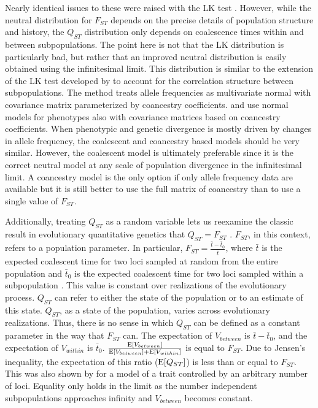 Nearly identical issues to these were raised with the LK test
\citep{Nei1975,Robertson1975}. However, while the neutral distribution for
$F_{ST}$ depends on the precise details of population structure and history, the
$Q_{ST}$ distribution only depends on coalescence times within and between
subpopulations. The point here is not that the LK distribution is particularly
bad, but rather that an improved neutral distribution is easily obtained using
the infinitesimal limit. This distribution is similar to the extension of the LK
test developed by \citet{Bonhomme2010} to account for the correlation structure
between subpopulations. The \citet{Bonhomme2010} method treats allele
frequencies as multivariate normal with covariance matrix parameterized by
coancestry coefficients. \citet{Ovaskainen2011} and \citet{Berg2014} use normal
models for phenotypes also with covariance matrices based on coancestry
coefficients. When phenotypic and genetic divergence is mostly driven by changes
in allele frequency, the coalescent and coancestry based models should be very
similar. However, the coalescent model is ultimately preferable since it is the
correct neutral model at any scale of population divergence in the infinitesimal
limit. A coancestry model is the only option if only allele frequency data are
available but it is still better to use the full matrix of coancestry than to
use a single value of $F_{ST}$.

Additionally, treating $Q_{ST}$ as a random variable lets us reexamine the
classic result in evolutionary quantitative genetics that $Q_{ST}=F_{ST}$
\citep{Whitlock1999}. $F_{ST}$, in this context, refers to a population
parameter. In particular, $F_{ST} = \frac{\bar{t} - \bar{t}_0}{\bar{t}}$, where
$\bar{t}$ is the expected coalescent time for two loci sampled at random from
the entire population and $\bar{t}_0$ is the expected coalescent time for two
loci sampled within a subpopulation \citep{Slatkin1991}. This value is constant
over realizations of the evolutionary process. $Q_{ST}$ can refer to either the
state of the population or to an estimate of this state. $Q_{ST}$, as a state of
the population, varies across evolutionary realizations. Thus, there is no sense
in which $Q_{ST}$ can be defined as a constant parameter in the way that
$F_{ST}$ can. The expectation of $V_{between}$ is $\bar{t} - \bar{t}_0$, and the
expectation of $V_{within}$ is $\bar{t}_0$.
$\frac{\mathrm{E}[V_{between}]}{\mathrm{E}[V_{between}] + \mathrm{E}[V_{within}]}$ is equal to $F_{ST}$.
Due to Jensen's inequality, the expectation of this ratio ($\mathrm{E}[Q_{ST}]$) is less
than or equal to $F_{ST}$. This was also shown by \citet{Edge2015} for a model
of a trait controlled by an arbitrary number of loci. Equality only holds in the
limit as the number independent subpopulations approaches infinity and
$V_{between}$ becomes constant.

